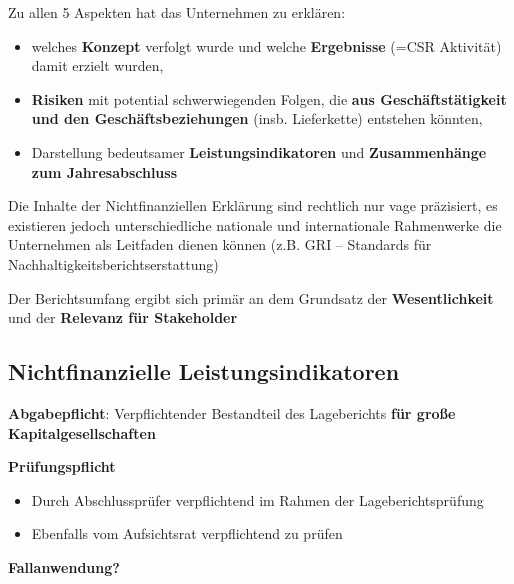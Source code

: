 \documentclass[
]{article}
\providecommand{\tightlist}{%
  \setlength{\itemsep}{0pt}\setlength{\parskip}{0pt}}
\begin{document}
Zu allen 5 Aspekten hat das Unternehmen zu erklären:

\begin{itemize}
\tightlist
\item
  welches \textbf{Konzept} verfolgt wurde und welche \textbf{Ergebnisse}
  (=CSR Aktivität) damit erzielt wurden,
\item
  \textbf{Risiken} mit potential schwerwiegenden Folgen, die \textbf{aus
  Geschäftstätigkeit und den Geschäftsbeziehungen} (insb. Lieferkette)
  entstehen könnten,
\item
  Darstellung bedeutsamer \textbf{Leistungsindikatoren} und
  \textbf{Zusammenhänge zum Jahresabschluss}
\end{itemize}

Die Inhalte der Nichtfinanziellen Erklärung sind rechtlich nur vage
präzisiert, es existieren jedoch unterschiedliche nationale und
internationale Rahmenwerke die Unternehmen als Leitfaden dienen können
(z.B. GRI -- Standards für Nachhaltigkeitsberichtserstattung)

Der Berichtsumfang ergibt sich primär an dem Grundsatz der
\textbf{Wesentlichkeit} und der \textbf{Relevanz für Stakeholder}

\hypertarget{nichtfinanzielle-leistungsindikatoren}{%
\subsection{Nichtfinanzielle
Leistungsindikatoren}\label{nichtfinanzielle-leistungsindikatoren}}

\textbf{Abgabepflicht}: Verpflichtender Bestandteil des Lageberichts
\textbf{für große Kapitalgesellschaften}

\textbf{Prüfungspflicht}

\begin{itemize}
\tightlist
\item
  Durch Abschlussprüfer verpflichtend im Rahmen der Lageberichtsprüfung
\item
  Ebenfalls vom Aufsichtsrat verpflichtend zu prüfen
\end{itemize}

\textbf{Fallanwendung?}
\end{document}
